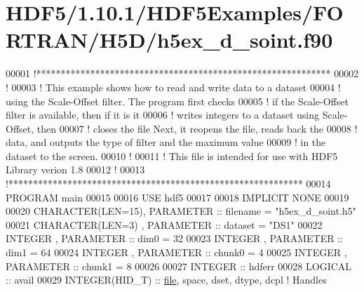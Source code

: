 \hypertarget{_h_d_f5_21_810_81_2_h_d_f5_examples_2_f_o_r_t_r_a_n_2_h5_d_2h5ex__d__soint_8f90_source}{}\section{H\+D\+F5/1.10.1/\+H\+D\+F5\+Examples/\+F\+O\+R\+T\+R\+A\+N/\+H5\+D/h5ex\+\_\+d\+\_\+soint.f90}
\label{_h_d_f5_21_810_81_2_h_d_f5_examples_2_f_o_r_t_r_a_n_2_h5_d_2h5ex__d__soint_8f90_source}

\begin{DoxyCode}
00001 \textcolor{comment}{!************************************************************}
00002 \textcolor{comment}{!}
00003 \textcolor{comment}{!  This example shows how to read and write data to a dataset}
00004 \textcolor{comment}{!  using the Scale-Offset filter.  The program first checks}
00005 \textcolor{comment}{!  if the Scale-Offset filter is available, then if it is it}
00006 \textcolor{comment}{!  writes integers to a dataset using Scale-Offset, then}
00007 \textcolor{comment}{!  closes the file Next, it reopens the file, reads back the}
00008 \textcolor{comment}{!  data, and outputs the type of filter and the maximum value}
00009 \textcolor{comment}{!  in the dataset to the screen.}
00010 \textcolor{comment}{!}
00011 \textcolor{comment}{!  This file is intended for use with HDF5 Library verion 1.8}
00012 \textcolor{comment}{!}
00013 \textcolor{comment}{!************************************************************}
00014 \textcolor{keyword}{PROGRAM} main
00015 
00016   \textcolor{keywordtype}{USE }hdf5
00017 
00018   \textcolor{keywordtype}{IMPLICIT NONE}
00019 
00020   \textcolor{keywordtype}{CHARACTER(LEN=15)}, \textcolor{keywordtype}{PARAMETER} :: filename = \textcolor{stringliteral}{"h5ex\_d\_soint.h5"}
00021   \textcolor{keywordtype}{CHARACTER(LEN=3)} , \textcolor{keywordtype}{PARAMETER} :: dataset  = \textcolor{stringliteral}{"DS1"}
00022   \textcolor{keywordtype}{INTEGER}          , \textcolor{keywordtype}{PARAMETER} :: dim0     = 32
00023   \textcolor{keywordtype}{INTEGER}          , \textcolor{keywordtype}{PARAMETER} :: dim1     = 64
00024   \textcolor{keywordtype}{INTEGER}          , \textcolor{keywordtype}{PARAMETER} :: chunk0   = 4
00025   \textcolor{keywordtype}{INTEGER}          , \textcolor{keywordtype}{PARAMETER} :: chunk1   = 8
00026 
00027   \textcolor{keywordtype}{INTEGER} :: hdferr
00028   \textcolor{keywordtype}{LOGICAL} :: avail
00029   \textcolor{keywordtype}{INTEGER(HID\_T)}  :: \hyperlink{structfile}{file}, space, dset, dtype, dcpl \textcolor{comment}{! Handles}

\end{DoxyCode}
